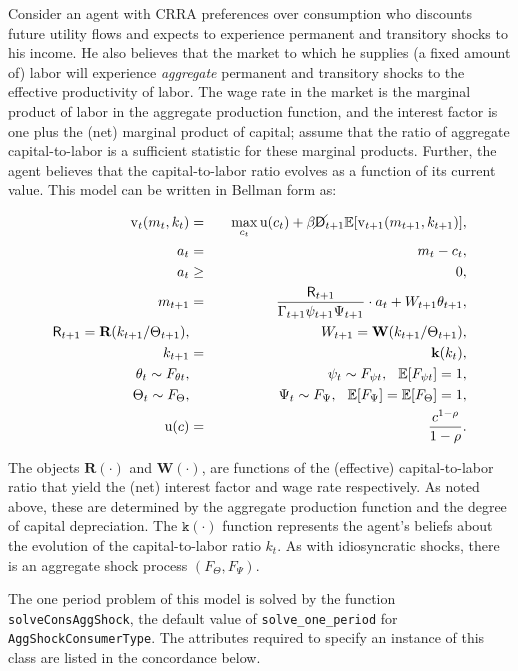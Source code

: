 \documentclass[12pt,titlepage,letterpaper]{econtex}
\newcommand{\E}{\mathbb{E}}
\begin{document}
Consider an agent with CRRA preferences over consumption who discounts future utility flows and expects to experience permanent and transitory shocks to his income.  He also believes that the market to which he supplies (a fixed amount of) labor will experience \textit{aggregate} permanent and transitory shocks to the effective productivity of labor.  The wage rate in the market is the marginal product of labor in the aggregate production function, and the interest factor is one plus the (net) marginal product of capital; assume that the ratio of aggregate capital-to-labor is a sufficient statistic for these marginal products.  Further, the agent believes that the capital-to-labor ratio evolves as a function of its current value.  This model can be written in Bellman form as:

\begin{eqnarray*}
\vFunc_t(m_t,k_t) &=& \max_{c_t} \utilFunc(c_t) + \beta \PLives_{t+1} \E [\vFunc_{t+1}(m_{t+1},k_{t+1}) ], \\
a_t &=& m_t - c_t, \\
a_t &\geq& 0, \\
m_{t+1} &=& \frac{\Rfree_{t+1}}{\Gamma_{t+1}\psi_{t+1} \Psi_{t+1}} \cdot a_t + W_{t+1} \theta_{t+1}, \\
\Rfree_{t+1} = \textbf{R}(k_{t+1}/\Theta_{t+1}), & & W_{t+1} = \textbf{W}(k_{t+1}/\Theta_{t+1}), \\
k_{t+1} &=& \textbf{k}(k_t), \\
\theta_t \sim F_{\theta t}, &\qquad& \psi_t \sim F_{\psi t}, \hspace{0.25cm} \E[F_{\psi t}] = 1, \\
\Theta_t \sim F_{\Theta}, &\qquad& \Psi_t \sim F_{\Psi}, \hspace{0.25cm} \E[F_{\Psi}] = \E[F_{\Theta}] = 1, \\
\utilFunc(c) &=& \frac{c^{1-\CRRA}}{1-\CRRA}.
\end{eqnarray*}

The objects $\textbf{R}(\cdot)$ and $\textbf{W}(\cdot)$, are functions of the (effective) capital-to-labor ratio that yield the (net) interest factor and wage rate respectively.  As noted above, these are determined by the aggregate production function and the degree of capital depreciation.  The $\texttt{k}(\cdot)$ function represents the agent's beliefs about the evolution of the capital-to-labor ratio $k_t$.  As with idiosyncratic shocks, there is an aggregate shock process $(F_{\Theta},F_{\Psi})$.

The one period problem of this model is solved by the function \texttt{solveConsAggShock}, the default value of \texttt{solve_one_period} for \texttt{AggShockConsumerType}.  The attributes required to specify an instance of this class are listed in the concordance below.
\end{document}
